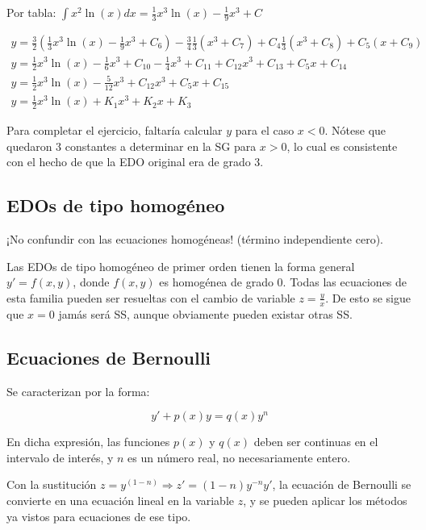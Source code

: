 \documentclass{article}
\begin{document}
Por tabla: $\int x^2 \ln(x) dx = \frac{1}{3} x^3 \ln(x) - \frac{1}{9} x^3 + C$

\begin{gather}
y = \frac{3}{2} \left( \frac{1}{3} x^3 \ln(x) - \frac{1}{9} x^3 + C_6 \right) -\frac{3}{4} \frac{1}{3} (x^3 + C_7) + C_4 \frac{1}{3} (x^3 + C_8) + C_5 (x + C_9) \\
y = \frac{1}{2} x^3 \ln(x) - \frac{1}{6} x^3 + C_{10} - \frac{1}{4} x^3 + C_{11} + C_{12} x^3 + C_{13} + C_5 x + C_{14} \\
y = \frac{1}{2} x^3 \ln(x) - \frac{5}{12} x^3 + C_{12} x^3 + C_5 x + C_{15} \\
y = \frac{1}{2} x^3 \ln(x) + K_1 x^3 + K_2 x + K_3
\end{gather}

Para completar el ejercicio, faltaría calcular $y$ para el caso $x<0$. Nótese que quedaron 3 constantes a determinar en la SG para $x >0$, lo cual es consistente con el hecho de que la EDO original era de grado 3.

\subsection{EDOs de tipo homogéneo}

¡No confundir con las ecuaciones homogéneas! (término independiente cero).

Las EDOs de tipo homogéneo de primer orden tienen la forma general $y' = f(x,y)$, donde $f(x,y)$ es homogénea de grado 0. Todas las ecuaciones de esta familia pueden ser resueltas con el cambio de variable $z = \frac{y}{x}$. De esto se sigue que $x = 0$ jamás será SS, aunque obviamente pueden existar otras SS.

\subsection{Ecuaciones de Bernoulli}

Se caracterizan por la forma:

\begin{equation}
y' + p(x) y = q(x) y^n
\end{equation}

En dicha expresión, las funciones $p(x)$ y $q(x)$ deben ser continuas en el intervalo de interés, y $n$ es un número real, no necesariamente entero.

Con la sustitución $z = y^{(1-n)} \Rightarrow z' = (1-n) y^{-n} y'$, la ecuación de Bernoulli se convierte en una ecuación lineal en la variable $z$, y se pueden aplicar los métodos ya vistos para ecuaciones de ese tipo.
\end{document}
